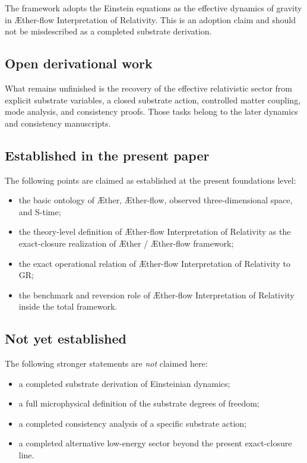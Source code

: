 \documentclass[11pt]{article}
\newcommand{\Aether}{\AE{}ther}
\newcommand{\Aflow}{\AE{}ther-flow}
\newcommand{\TheoryName}{\Aflow{} Interpretation of Relativity}
\newcommand{\TheoryProgram}{\Aether{} / \Aflow{} framework}
\begin{document}
The framework adopts the Einstein equations as the effective dynamics of gravity in \TheoryName{}. This is an adoption claim and should not be misdescribed as a completed substrate derivation.

\subsection{Open derivational work}

What remains unfinished is the recovery of the effective relativistic sector from explicit substrate variables, a closed substrate action, controlled matter coupling, mode analysis, and consistency proofs. Those tasks belong to the later dynamics and consistency manuscripts.

\subsection{Established in the present paper}

The following points are claimed as established at the present foundations level:
\begin{itemize}
    \item the basic ontology of \Aether{}, \Aflow{}, observed three-dimensional space, and S-time;
    \item the theory-level definition of \TheoryName{} as the exact-closure realization of \TheoryProgram{};
    \item the exact operational relation of \TheoryName{} to GR;
    \item the benchmark and reversion role of \TheoryName{} inside the total framework.
\end{itemize}

\subsection{Not yet established}

The following stronger statements are \emph{not} claimed here:
\begin{itemize}
    \item a completed substrate derivation of Einsteinian dynamics;
    \item a full microphysical definition of the substrate degrees of freedom;
    \item a completed consistency analysis of a specific substrate action;
    \item a completed alternative low-energy sector beyond the present exact-closure line.
\end{itemize}
\end{document}
